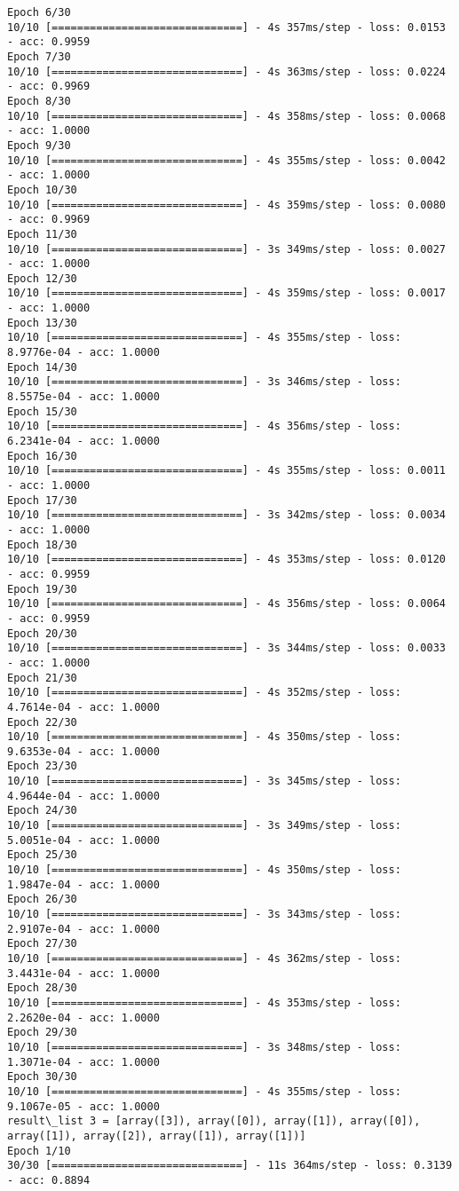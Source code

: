 \documentclass[11pt]{article}
\begin{document}
\begin{Verbatim}[commandchars=\\\{\}]
Epoch 6/30
10/10 [==============================] - 4s 357ms/step - loss: 0.0153 - acc: 0.9959
Epoch 7/30
10/10 [==============================] - 4s 363ms/step - loss: 0.0224 - acc: 0.9969
Epoch 8/30
10/10 [==============================] - 4s 358ms/step - loss: 0.0068 - acc: 1.0000
Epoch 9/30
10/10 [==============================] - 4s 355ms/step - loss: 0.0042 - acc: 1.0000
Epoch 10/30
10/10 [==============================] - 4s 359ms/step - loss: 0.0080 - acc: 0.9969
Epoch 11/30
10/10 [==============================] - 3s 349ms/step - loss: 0.0027 - acc: 1.0000
Epoch 12/30
10/10 [==============================] - 4s 359ms/step - loss: 0.0017 - acc: 1.0000
Epoch 13/30
10/10 [==============================] - 4s 355ms/step - loss: 8.9776e-04 - acc: 1.0000
Epoch 14/30
10/10 [==============================] - 3s 346ms/step - loss: 8.5575e-04 - acc: 1.0000
Epoch 15/30
10/10 [==============================] - 4s 356ms/step - loss: 6.2341e-04 - acc: 1.0000
Epoch 16/30
10/10 [==============================] - 4s 355ms/step - loss: 0.0011 - acc: 1.0000
Epoch 17/30
10/10 [==============================] - 3s 342ms/step - loss: 0.0034 - acc: 1.0000
Epoch 18/30
10/10 [==============================] - 4s 353ms/step - loss: 0.0120 - acc: 0.9959
Epoch 19/30
10/10 [==============================] - 4s 356ms/step - loss: 0.0064 - acc: 0.9959
Epoch 20/30
10/10 [==============================] - 3s 344ms/step - loss: 0.0033 - acc: 1.0000
Epoch 21/30
10/10 [==============================] - 4s 352ms/step - loss: 4.7614e-04 - acc: 1.0000
Epoch 22/30
10/10 [==============================] - 4s 350ms/step - loss: 9.6353e-04 - acc: 1.0000
Epoch 23/30
10/10 [==============================] - 3s 345ms/step - loss: 4.9644e-04 - acc: 1.0000
Epoch 24/30
10/10 [==============================] - 3s 349ms/step - loss: 5.0051e-04 - acc: 1.0000
Epoch 25/30
10/10 [==============================] - 4s 350ms/step - loss: 1.9847e-04 - acc: 1.0000
Epoch 26/30
10/10 [==============================] - 3s 343ms/step - loss: 2.9107e-04 - acc: 1.0000
Epoch 27/30
10/10 [==============================] - 4s 362ms/step - loss: 3.4431e-04 - acc: 1.0000
Epoch 28/30
10/10 [==============================] - 4s 353ms/step - loss: 2.2620e-04 - acc: 1.0000
Epoch 29/30
10/10 [==============================] - 3s 348ms/step - loss: 1.3071e-04 - acc: 1.0000
Epoch 30/30
10/10 [==============================] - 4s 355ms/step - loss: 9.1067e-05 - acc: 1.0000
result\_list 3 = [array([3]), array([0]), array([1]), array([0]), array([1]), array([2]), array([1]), array([1])]
Epoch 1/10
30/30 [==============================] - 11s 364ms/step - loss: 0.3139 - acc: 0.8894

\end{Verbatim}
\end{document}
